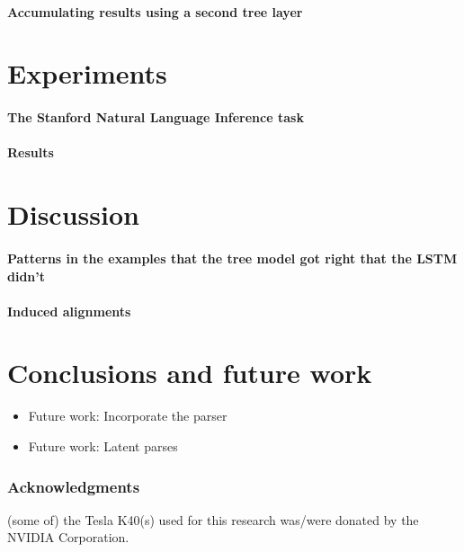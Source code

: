 \documentclass[11pt,letterpaper]{article}
\begin{document}
\paragraph{Accumulating results using a second tree layer}

\section{Experiments}

\paragraph{The Stanford Natural Language Inference task} \cite{snli:emnlp2015}

\paragraph{Results}

\section{Discussion}

\paragraph{Patterns in the examples that the tree model got right that the LSTM didn't}

\paragraph{Induced alignments}

\section{Conclusions and future work}

\begin{itemize}
\item Future work: Incorporate the parser
\item Future work: Latent parses
\end{itemize}

\subsubsection*{Acknowledgments}

(some of) the Tesla K40(s) used for this research was/were donated by the NVIDIA Corporation.


 
\end{document}
